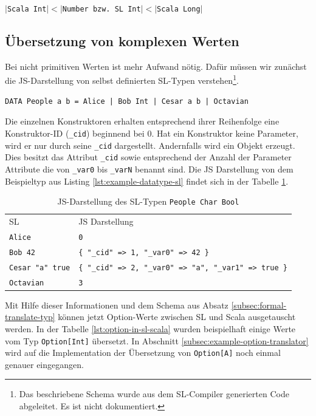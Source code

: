 \documentclass[12pt,bibtotoc]{scrreprt}
\begin{document}
\begin{center}
$|$\lstinline!Scala Int!$| < |$\lstinline!Number bzw. SL Int!$| < |$\lstinline!Scala Long!$|$
\end{center}

\subsection{Übersetzung von komplexen Werten}

Bei nicht primitiven Werten ist mehr Aufwand nötig. Dafür müssen wir zunächst die JS-Darstellung von selbst definierten SL-Typen verstehen\footnote{Das beschriebene Schema wurde aus dem SL-Compiler generierten Code abgeleitet. Es ist nicht dokumentiert.}.

\begin{lstlisting}[caption=Beispiel eines selbst definierten Typs, label=lst:example-datatype-sl]
DATA People a b = Alice | Bob Int | Cesar a b | Octavian
\end{lstlisting}

Die einzelnen Konstruktoren erhalten entsprechend ihrer Reihenfolge eine Konstruktor-ID (\lstinline!_cid!) beginnend bei $0$. Hat ein Konstruktor keine Parameter, wird er nur durch seine \lstinline!_cid! dargestellt. Andernfalls wird ein Objekt erzeugt. Dies besitzt das Attribut \lstinline!_cid! sowie entsprechend der Anzahl der Parameter Attribute die von \lstinline!_var0! bis \lstinline!_varN! benannt sind. Die JS Darstellung von dem Beispieltyp aus Listing \ref{lst:example-datatype-sl} findet sich in der Tabelle \ref{tab:js-code-of-people}.

\begin{table}[h]
\caption{JS-Darstellung des SL-Typen \lstinline!People Char Bool!}
\centering
\begin{tabular}{ll}
 \ac{SL}              &  \ac{JS} Darstellung \\
\lstinline!Alice!           &  \lstinline!0! \\
\lstinline!Bob 42!          &  \lstinline!{ "_cid" => 1, "_var0" => 42 }! \\
\lstinline!Cesar "a" true!  &  \lstinline!{ "_cid" => 2, "_var0" => "a", "_var1" => true }! \\
\lstinline!Octavian!        &  \lstinline!3! \\
\end{tabular}
\label{tab:js-code-of-people}
\end{table}

Mit Hilfe dieser Informationen und dem Schema aus Absatz \ref{subsec:formal-translate-typ} können jetzt Option-Werte zwischen SL und Scala ausgetauscht werden. In der Tabelle \ref{lst:option-in-sl-scala} wurden beispielhaft einige Werte vom Typ \lstinline!Option[Int]! übersetzt. In Abschnitt \ref{subsec:example-option-translator} wird auf die Implementation der Übersetzung von \lstinline!Option[A]! noch einmal genauer eingegangen.
\end{document}
